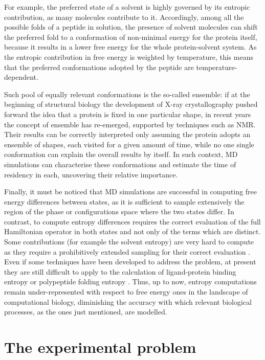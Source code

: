 For example, the preferred state of a solvent is highly governed by its entropic contribution, as many molecules contribute to it. Accordingly, among all the possible folds of a peptide in solution, the presence of solvent molecules can shift the preferred fold to a conformation of non-minimal energy for the protein itself, because it results in a lower free energy for the whole protein-solvent system.
%
As the entropic contribution in free energy is weighted by temperature, this means that the preferred conformations adopted by the peptide are temperature-dependent.

Such pool of equally relevant conformations is the so-called ensemble: if at the beginning of structural biology the development of X-ray crystallography pushed forward the idea that a protein is fixed in one particular shape, in recent years the concept of ensemble has re-emerged, supported by techniques such as NMR. Their results can be correctly interpreted only assuming the protein adopts an ensemble of shapes, each visited for a given amount of time, while no one single conformation can explain the overall results by itself. In such context, MD simulations can characterise these conformations and estimate the time of residency in each, uncovering their relative importance.

Finally, it must be noticed that MD simulations are successful in computing free energy differences between states, as it is sufficient to sample extensively the region of the phase or configurations space where the two states differ. In contrast, to compute entropy differences requires the correct evaluation of the full Hamiltonian operator in both states and not only of the terms which are distinct.
%
Some contributions (for example the solvent entropy) are very hard to compute as they require a prohibitively extended sampling for their correct evaluation \cite{142}.
%
Even if some techniques have been developed to address the problem, at present they are still difficult to apply to the calculation of ligand-protein binding entropy or polypeptide folding entropy \cite{142}. Thus, up to now, entropy computations remain under-represented with respect to free energy ones in the landscape of computational biology, diminishing the accuracy with which relevant biological processes, as the ones just mentioned, are modelled.


\section{The experimental problem}

